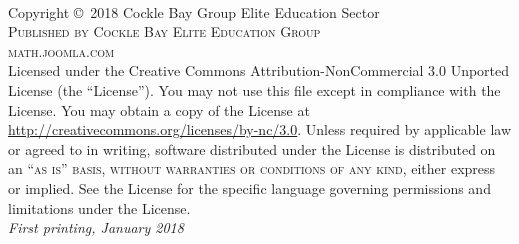 \documentclass[11pt,fleqn,table,svgnames,dvipsnames]{book} %
\begin{document}

\begingroup
\thispagestyle{empty}
\vfill
\endgroup


\newpage
~\vfill
\thispagestyle{empty}

\noindent Copyright \copyright\ 2018 Cockle Bay Group Elite Education Sector\\ %

\noindent \textsc{Published by Cockle Bay Elite Education Group}\\ %

\noindent \textsc{math.joomla.com}\\ %

\noindent Licensed under the Creative Commons Attribution-NonCommercial 3.0 Unported License (the ``License''). You may not use this file except in compliance with the License. You may obtain a copy of the License at \url{http://creativecommons.org/licenses/by-nc/3.0}. Unless required by applicable law or agreed to in writing, software distributed under the License is distributed on an \textsc{``as is'' basis, without warranties or conditions of any kind}, either express or implied. See the License for the specific language governing permissions and limitations under the License.\\ %

\noindent \textit{First printing, January 2018} %
\end{document}
